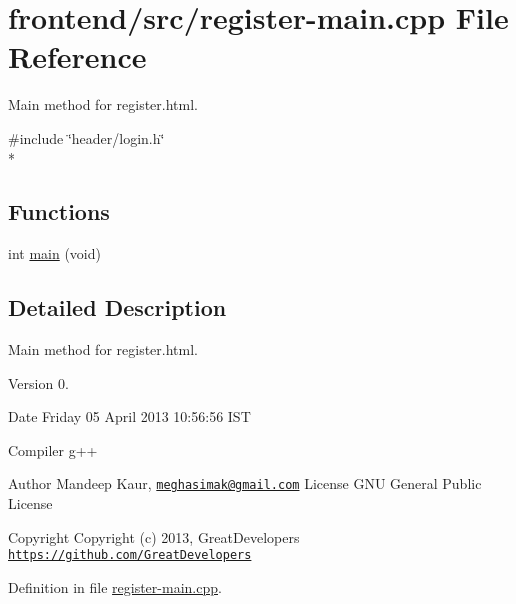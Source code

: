 \hypertarget{register-main_8cpp}{\section{frontend/src/register-\/main.cpp File Reference}
\label{register-main_8cpp}
}


Main method for register.\-html.  


{\ttfamily \#include \char`\"{}header/login.\-h\char`\"{}}\\*
\subsection*{Functions}
\begin{DoxyCompactItemize}
\item 
int \hyperlink{register-main_8cpp_a840291bc02cba5474a4cb46a9b9566fe}{main} (void)
\end{DoxyCompactItemize}


\subsection{Detailed Description}
Main method for register.\-html. \begin{DoxyVersion}{Version}
0. 
\end{DoxyVersion}
\begin{DoxyDate}{Date}
Friday 05 April 2013 10\-:56\-:56 I\-S\-T\par
Compiler g++
\end{DoxyDate}
\begin{DoxyAuthor}{Author}
Mandeep Kaur, \href{mailto:meghasimak@gmail.com}{\tt meghasimak@gmail.\-com} License G\-N\-U General Public License 
\end{DoxyAuthor}
\begin{DoxyCopyright}{Copyright}
Copyright (c) 2013, Great\-Developers \href{https://github.com/GreatDevelopers}{\tt https\-://github.\-com/\-Great\-Developers} 
\end{DoxyCopyright}


Definition in file \hyperlink{register-main_8cpp_source}{register-\/main.\-cpp}.



